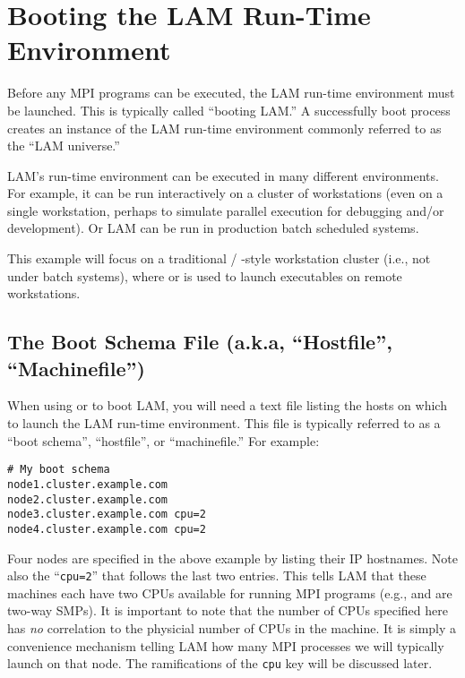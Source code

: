 \section{Booting the LAM Run-Time Environment}
\label{sec:getting-started-booting}

Before any MPI programs can be executed, the LAM run-time environment
must be launched.  This is typically called ``booting LAM.''  A
successfully boot process creates an instance of the LAM run-time
environment commonly referred to as the ``LAM universe.''

LAM's run-time environment can be executed in many different
environments.  For example, it can be run interactively on a cluster
of workstations (even on a single workstation, perhaps to simulate
parallel execution for debugging and/or development).  Or LAM can be
run in production batch scheduled systems.

This example will focus on a traditional  / -style
workstation cluster (i.e., not under batch systems), where 
or  is used to launch executables on remote workstations.


\subsection{The Boot Schema File (a.k.a, ``Hostfile'', ``Machinefile'')}
\label{sec:getting-started-hostfile}

When using  or  to boot LAM, you will need a text
file listing the hosts on which to launch the LAM run-time
environment.  This file is typically referred to as a ``boot schema'',
``hostfile'', or ``machinefile.''  For example:

\lstset{style=lam-shell}
\begin{lstlisting}
# My boot schema
node1.cluster.example.com
node2.cluster.example.com
node3.cluster.example.com cpu=2
node4.cluster.example.com cpu=2
\end{lstlisting}

Four nodes are specified in the above example by listing their IP
hostnames.  Note also the ``{\tt cpu=2}'' that follows the last two
entries.  This tells LAM that these machines each have two CPUs
available for running MPI programs (e.g.,  and
 are two-way SMPs).  It is important to note that the
number of CPUs specified here has {\em no} correlation to the
physicial number of CPUs in the machine.  It is simply a convenience
mechanism telling LAM how many MPI processes we will typically launch
on that node.  The ramifications of the {\tt cpu} key will be discussed
later.

